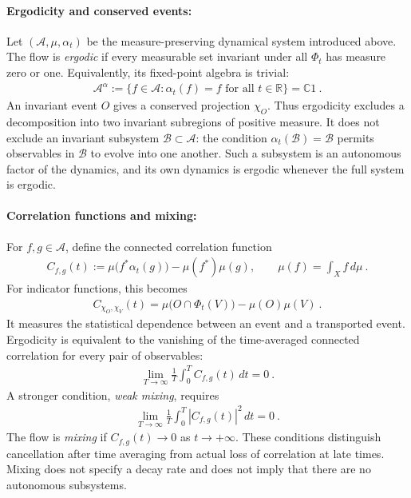 \documentclass[a4paper,11pt]{article}
\theoremstyle{definition}
\newcommand{\mA}{\mathcal{A}}
\newcommand{\mB}{\mathcal{B}}
\begin{document}
\paragraph{Ergodicity and conserved events:}
Let $(\mA,\mu,\alpha_t)$ be the measure-preserving dynamical system introduced above. The flow is {\it ergodic} if every measurable set invariant under all $\Phi_t$ has measure zero or one. Equivalently, its fixed-point algebra is trivial:
\begin{align}
    \mA^\alpha
    :=\{f\in\mA:\alpha_t(f)=f\text{ for all }t\in\mathbb R\}
    =\mathbb C1\ .
\end{align}
An invariant event $O$ gives a conserved projection $\chi_O$. Thus ergodicity excludes a decomposition into two invariant subregions of positive measure. It does not exclude an invariant subsystem $\mB\subset\mA$: the condition $\alpha_t(\mB)=\mB$ permits observables in $\mB$ to evolve into one another. Such a subsystem is an autonomous factor of the dynamics, and its own dynamics is ergodic whenever the full system is ergodic.

\paragraph{Correlation functions and mixing:}
For $f,g\in\mA$, define the connected correlation function
\begin{align}
    C_{f,g}(t)
    :=\mu\bigl(f^*\alpha_t(g)\bigr)-\mu(f^*)\mu(g),
    \qquad \mu(f)=\int_X f\,d\mu\ .
\end{align}
For indicator functions, this becomes
\begin{align}
    C_{\chi_O,\chi_V}(t)
    =\mu\bigl(O\cap\Phi_t(V)\bigr)-\mu(O)\mu(V)\ .
\end{align}
It measures the statistical dependence between an event and a transported event. Ergodicity is equivalent to the vanishing of the time-averaged connected correlation for every pair of observables:
\begin{align}
    \lim_{T\to\infty}\frac{1}{T}\int_0^T C_{f,g}(t)\,dt=0\ .
\end{align}
A stronger condition, {\it weak mixing}, requires
\begin{align}
    \lim_{T\to\infty}\frac{1}{T}\int_0^T |C_{f,g}(t)|^2\,dt=0\ .
\end{align}
The flow is {\it mixing} if $C_{f,g}(t)\to0$ as $t\to+\infty$. These conditions distinguish cancellation after time averaging from actual loss of correlation at late times. Mixing does not specify a decay rate and does not imply that there are no autonomous subsystems.
\end{document}
